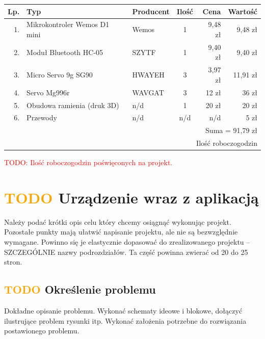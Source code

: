 \documentclass[11pt,titlepage]{article}
\begin{document}
\begin{center}
    \begin{tabular}{|r|l|l|c|r|r|}
        \hline
        Lp. & Typ                          & Producent & Ilość & Cena    & Wartość  \\
        \hline
        1.  & Mikrokontroler Wemos D1 mini & Wemos     & 1     & 9,48 zł & 9,48 zł  \\
        2.  & Moduł Bluetooth HC-05        & SZYTF     & 1     & 9,40 zł & 9,40 zł  \\
        3.  & Micro Servo 9g SG90          & HWAYEH    & 3     & 3,97 zł & 11,91 zł \\
        4.  & Servo Mg996r                 & WAVGAT    & 3     & 12 zł   & 36 zł    \\
        5.  & Obudowa ramienia (druk 3D)   & n/d       & 1     & 20 zł   & 20 zł    \\
        6.  & Przewody                     & n/d       & n/d   & n/d     & 5 zł     \\
        \hline
        \multicolumn{6}{|r|}{Suma = 91,79 zł}                                       \\
        \hline
        \multicolumn{6}{|r|}{Ilość roboczogodzin}                                   \\
        \hline
    \end{tabular}
\end{center}

\textcolor{red}{TODO: Ilość roboczogodzin poświęconych na projekt.}

\newpage

\section{\textcolor{orange}{TODO} Urządzenie wraz z aplikacją}

Należy podać krótki opis celu który chcemy osiągnąć wykonując projekt.
Pozostałe punkty mają ułatwić napisanie projektu, ale nie są bezwzględnie wymagane. Powinno się je elastycznie dopasować do zrealizowanego projektu – SZCZEGÓLNIE nazwy podrozdziałów.
Ta część powinna zwierać od 20 do 25 stron.

\subsection{\textcolor{orange}{TODO} Określenie problemu}

Dokładne opisanie problemu. Wykonać schematy ideowe i blokowe, dołączyć ilustrujące problem rysunki itp. Wykonać założenia potrzebne do rozwiązania postawionego problemu.
\end{document}
